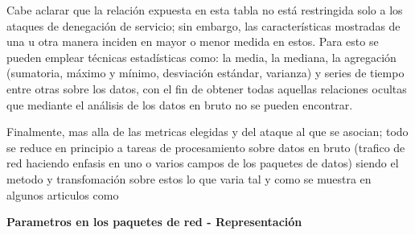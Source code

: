 \documentclass[12pt]{article}
\begin{document}
Cabe aclarar que la relación expuesta en esta tabla no está restringida solo a los ataques de denegación de servicio; sin embargo, las características mostradas de una u otra manera inciden en mayor o menor medida en estos. Para esto se pueden emplear técnicas estadísticas \citep{sans_ids_metrics} como: la media, la mediana, la agregación (sumatoria, máximo y mínimo, desviación estándar, varianza) y series de tiempo entre otras sobre los datos, con el fin de obtener todas aquellas relaciones ocultas que mediante el análisis de los datos en bruto no se pueden encontrar.  

Finalmente, mas alla de las metricas elegidas y del ataque al que se asocian; todo se reduce en principio a tareas de procesamiento sobre datos en bruto (trafico de red haciendo enfasis en uno o varios campos de los paquetes de datos) siendo el metodo y transfomación sobre estos lo que varia tal y como se muestra en algunos articulos como \citep{review_ddos_approaches,det_tech_ddos} 

\textbf{Parametros en los paquetes de red - Representación}
\end{document}
